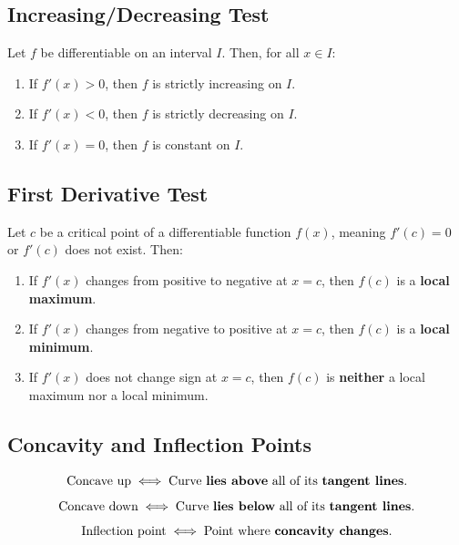 \documentclass[a4paper,11pt]{article}
\theoremstyle{definition}
\theoremstyle{plain}
\theoremstyle{remark}
\begin{document}


\subsection{Increasing/Decreasing Test}

\begin{tcolorbox}
    Let $f$ be differentiable on an interval $I$. Then, for all $x \in I$:
    \begin{enumerate}
        \item If $f'(x) > 0$, then $f$ is strictly increasing on $I$.
        \item If $f'(x) < 0$, then $f$ is strictly decreasing on $I$.
        \item If $f'(x) = 0$, then $f$ is constant on $I$.
    \end{enumerate}
\end{tcolorbox}




\subsection{First Derivative Test}

\begin{tcolorbox}
    Let $c$ be a critical point of a differentiable function $f(x)$, meaning $f'(c)=0$ or $f'(c)$ does not exist. Then:
    \begin{enumerate}
        \item If $f'(x)$ changes from positive to negative at $x=c$, then $f(c)$ is a \textbf{local maximum}.
        \item If $f'(x)$ changes from negative to positive at $x=c$, then $f(c)$ is a \textbf{local minimum}.
        \item If $f'(x)$ does not change sign at $x=c$, then $f(c)$ is \textbf{neither} a local maximum nor a local minimum.
    \end{enumerate}
\end{tcolorbox}




\subsection{Concavity and Inflection Points}

\begin{tcolorbox}
    \[\text{Concave up} \iff \text{Curve \textbf{lies above} all of its \textbf{tangent lines}}.\]
    \[\text{Concave down} \iff \text{Curve \textbf{lies below} all of its \textbf{tangent lines}}.\]
    \[\text{Inflection point} \iff \text{Point where \textbf{concavity changes}}.\]
\end{tcolorbox}
\end{document}

